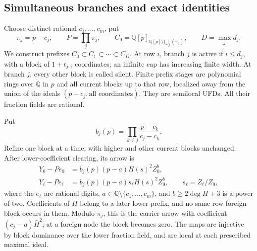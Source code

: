 \documentclass[11pt,reqno]{amsart}
\numberwithin{equation}{section}
\theoremstyle{plain}
\theoremstyle{definition}
\theoremstyle{remark}
\begin{document}
\subsection{Simultaneous branches and exact identities}

Choose distinct rational \(c_1,\ldots,c_m\), put
\[
 \pi_j=p-c_j,\qquad P=\prod_j\pi_j,\qquad
 C_0=\mathbb Q[p]_{\mathbb Q[p]\setminus\bigcup_j(\pi_j)},
 \qquad D=\max_jd_j.
\]
We construct prefixes \(C_0\subset C_1\subset\cdots\subset C_D\).
At row \(i\), branch \(j\) is active if \(i\le d_j\), with a block
of \(1+t_{j,i}\) coordinates; an infinite cap has increasing finite
width. At branch \(j\), every other block is called silent.
Finite prefix stages are polynomial rings over \(\mathbb Q\) in
\(p\) and all current blocks up to that row, localized away from
the union of the ideals
\((p-c_j,\text{all coordinates})\).
They are semilocal UFDs. All their fraction fields are rational.

Put
\[
 b_j(p)=\prod_{k\ne j}\frac{p-c_k}{c_j-c_k}.
\]
Refine one block at a time, with higher and other current blocks
unchanged. After lower-coefficient clearing, its arrow is
\begin{equation}\label{eq:ordinary-full-arrow}
 \begin{split}
 Y_0-Pe_0&=b_j(p)(p-a)H(s)^2Z_0^b,\\
 Y_\ell-Pe_\ell&=b_j(p)(p-a)s_\ell H(s)^2Z_0^b,
       \qquad s_\ell=Z_\ell/Z_0,
 \end{split}
\end{equation}
where the \(e_\ell\) are rational digits, \(a\in\mathbb Q\setminus
\{c_1,\ldots,c_m\}\), and \(b\ge2\deg H+3\) is a power of two.
Coefficients of \(H\) belong to a later lower prefix, and no
same-row foreign block occurs in them. Modulo \(\pi_j\), this
is the carrier arrow with coefficient \((c_j-a)\bar H^2\);
at a foreign node the block becomes zero. The maps are injective
by block dominance over the lower fraction field, and are local
at each prescribed maximal ideal.
\end{document}
